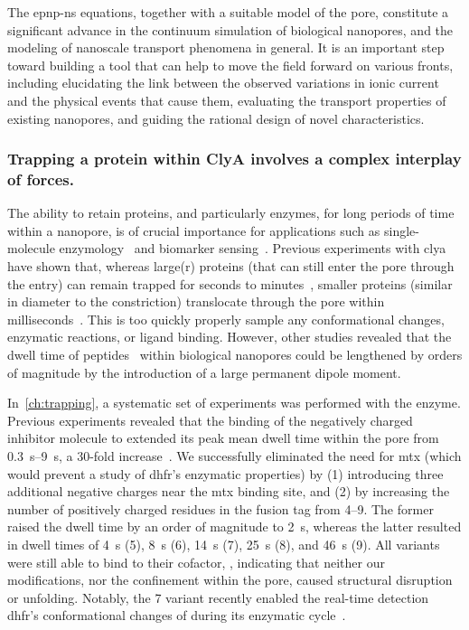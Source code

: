 The \gls{epnp-ns} equations, together with a suitable model of the pore, constitute a significant advance in
the continuum simulation of biological nanopores, and the modeling of nanoscale transport phenomena in
general. It is an important step toward building a tool that can help to move the field forward on various
fronts, including elucidating the link between the observed variations in ionic current and the physical
events that cause them, evaluating the transport properties of existing nanopores, and guiding the rational
design of novel characteristics.


\subsubsection{Trapping a protein within {ClyA} involves a complex interplay of forces.}
%

The ability to retain proteins, and particularly enzymes, for long periods of time within a nanopore, is of
crucial importance for applications such as single-molecule
enzymology~\cite{Willems-VanMeervelt-2017,VanMeervelt-2014,Wloka-2017,Thakur-2019,Galenkamp-2020} and
biomarker sensing~\cite{VanMeervelt-2017,Galenkamp-2018,Zernia-2020}. Previous experiments with \gls{clya}
have shown that, whereas large(r) proteins (that can still enter the pore through the \cisi{} entry) can
remain trapped for seconds to
minutes~\cite{Soskine-2013,Soskine-2012,Soskine-Biesemans-2015,Biesemans-2015,VanMeervelt-2014,VanMeervelt-2017},
smaller proteins (similar in diameter to the \transi{} constriction) translocate through the pore within
milliseconds~\cite{Soskine-2012}. This is too quickly properly sample any conformational changes, enzymatic
reactions, or ligand binding. However, other studies revealed that the dwell time of
peptides~\cite{Movileanu-2005,Asandei-2015,Asandei-2016} within biological nanopores could be lengthened by
orders of magnitude by the introduction of a large permanent dipole moment.

In~\cref{ch:trapping}, a systematic set of experiments was performed with the \DHFRt{} enzyme. Previous
experiments revealed that the binding of the negatively charged inhibitor molecule  to \DHFRt{}
extended its peak mean dwell time within the pore from \SIrange{0.3}{9}{\second}, a 30-fold
increase~\cite{Soskine-Biesemans-2015}. We successfully eliminated the need for \gls{mtx} (which would prevent
a study of \gls{dhfr}'s enzymatic properties) by (1) introducing three additional negative charges near the
\gls{mtx} binding site, and (2) by increasing the number of positively charged residues in the fusion tag from
\numrange{+4}{+9}. The former raised the dwell time by an order of magnitude to \SI{2}{\second}, whereas the
latter resulted in dwell times of \SI{4}{\second} (\num{+5}), \SI{8}{\second} (\num{+6}), \SI{14}{\second}
(\num{+7}), \SI{25}{\second} (\num{+8}), and \SI{46}{\second} (\num{+9}). All variants were still able to bind
to their cofactor, , indicating that neither our modifications, nor the confinement within the pore,
caused structural disruption or unfolding. Notably, the \num{+7} \DHFRt{} variant recently enabled the
real-time detection \gls{dhfr}'s conformational changes of during its enzymatic cycle~\cite{Galenkamp-2020}.

